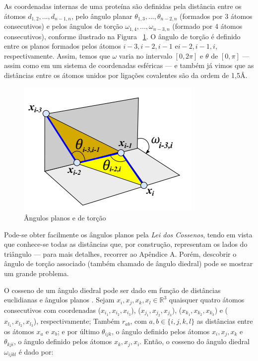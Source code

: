 \documentclass[a4paper,12pt]{article}
\begin{document}
 	As coordenadas internas de uma proteína são definidas pela distância entre os átomos $d_{1,2}, ..., d_{n - 1,n}$, pelo ângulo planar $\theta_{1,3}, ...,\theta_{n - 2,n}$ (formados por 3 átomos consecutivos) e pelos ângulos de torção $\omega_{1,4}, ..., \omega_{n-3,n}$ (formado por 4 átomos consecutivos), conforme ilustrado na Figura ~\ref{fig:angulos}. O ângulo de torção é definido entre os planos formados pelos átomos $i-3,i-2,i-1$ e$i-2,i-1,i$, respectivamente. Assim, temos que $\omega$ varia no intervalo $[0,2\pi]$ e $\theta$ de $[0,\pi]$ --- assim como em um sistema de coordenadas esféricas --- e também já vimos que as distâncias entre os átomos unidos por ligações covalentes são da ordem de 1,5\AA. 
 	
 	\begin{figure}[H]
 		\begin{center}
 			\includegraphics[width=0.6\linewidth]{Capturar.PNG}
 		\end{center}
 		\caption{Ângulos planos e de torção \cite{carlileBook31Coloquio}}
 		\label{fig:angulos}
 	\end{figure}
 	
 	Pode-se obter facilmente os ângulos planos pela \textit{Lei dos Cossenos}, tendo em vista que conhece-se todas as distâncias que, por construção, representam os lados do triângulo --- para mais detalhes, recorrer ao Apêndice A. Porém, descobrir o ângulo de torção associado (também chamado de ângulo diedral) pode se mostrar um grande problema. 
 	
 	O cosseno de um ângulo diedral pode ser dado em função de distâncias euclidianas e ângulos planos \cite{carlileTese}. Sejam $x_i, x_j, x_k, x_l \in \mathbb{R}^3$ quaisquer quatro átomos consecutivos com coordenadas ($x_{i_1}, x_{i_2}, x_{i_3}$), ($x_{j_1}, x_{j_2}, x_{j_3}$), ($x_{k_1}, x_{k_2}, x_{k_3}$) e ($x_{l_1}, x_{l_2}, x_{l_3}$), respectivamente; Também $r_{ab}$, com $a,b \in \{i,j,k,l\}$ as distâncias entre os átomos $x_a$ e $x_b$; e por último $\theta_{ijk}$, o ângulo definido pelos átomos $x_i, x_j, x_k$ e $\theta_{kji}$, o ângulo definido pelos átomos $x_k, x_j, x_i$. Então, o cosseno do ângulo diedral $\omega_{ijkl}$ é dado por:
 	
\end{document}

